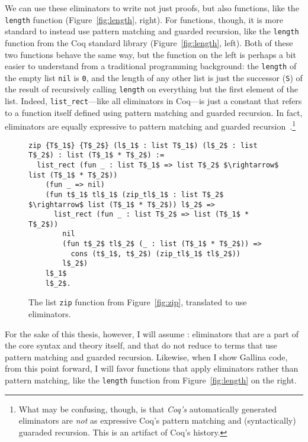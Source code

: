 We can use these eliminators to write not just proofs, but also functions, like the \lstinline{length} function (Figure~\ref{fig:length}, right).
For functions, though, it is more standard to instead use pattern matching and guarded recursion, like 
the \lstinline{length} function from the Coq standard library (Figure~\ref{fig:length}, left).
Both of these two functions behave the same way, but the function on the left is perhaps a bit easier to understand from a traditional programming background:
the \lstinline{length} of the empty list \lstinline{nil} is \lstinline{0}, and the length of any other list
is just the successor (\lstinline{S}) of the result of recursively calling \lstinline{length} on everything but the first element of the list.
Indeed, \lstinline{list_rect}---like all eliminators in Coq---is just a constant that refers to a function itself defined using pattern matching and guarded recursion.
In fact, eliminators are equally expressive to pattern matching and 
guarded recursion~\cite{recursion-elimination, jesper}.\footnote{What may be confusing, though, is that \textit{Coq's} automatically 
generated eliminators are \textit{not} as expressive Coq's pattern matching and (syntactically) guaraded recursion. This is an artifact of Coq's history.}

\begin{figure}
\begin{lstlisting}
zip {T$_1$} {T$_2$} (l$_1$ : list T$_1$) (l$_2$ : list T$_2$) : list (T$_1$ * T$_2$) :=
  list_rect (fun _ : list T$_1$ => list T$_2$ $\rightarrow$ list (T$_1$ * T$_2$))
    (fun _ => nil)
    (fun t$_1$ tl$_1$ (zip_tl$_1$ : list T$_2$ $\rightarrow$ list (T$_1$ * T$_2$)) l$_2$ =>
      list_rect (fun _ : list T$_2$ => list (T$_1$ * T$_2$))
        nil
        (fun t$_2$ tl$_2$ (_ : list (T$_1$ * T$_2$)) =>
          cons (t$_1$, t$_2$) (zip_tl$_1$ tl$_2$))
        l$_2$)
    l$_1$
    l$_2$.
\end{lstlisting}
\caption{The list \lstinline{zip} function from Figure~\ref{fig:zip}, translated to use eliminators.}
\label{fig:zip-elim}
\end{figure}

For the sake of this thesis, however, I will assume : eliminators that are a part of the core syntax and theory itself,
and that do not reduce to terms that use pattern matching and guarded recursion.
Likewise, when I show Gallina code, from this point forward, I will favor functions that apply eliminators rather than pattern matching, like the \lstinline{length} function from Figure~\ref{fig:length}
on the right.

